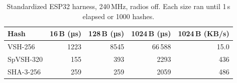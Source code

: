 \begin{table}[ht]
\caption{Standardized ESP32 harness, 240\,MHz, radios off. Each size ran until 1\,s elapsed or 1000 hashes.}
\label{tab:esp32-throughput}
\centering
\begin{tabular}{@{}lrrrr@{}}
\toprule
Hash & 16\,B (µs) & 128\,B (µs) & 1024\,B (µs) & 1024\,B (KB/s) \\
\midrule
VSH-256 & 1223 & 8545 & 66\,588 & 15.0 \\
SpVSH-320 & 155 & 393 & 2293 & 436 \\
SHA-3-256 & 259 & 259 & 2059 & 486 \\
\bottomrule
\end{tabular}
\end{table}
